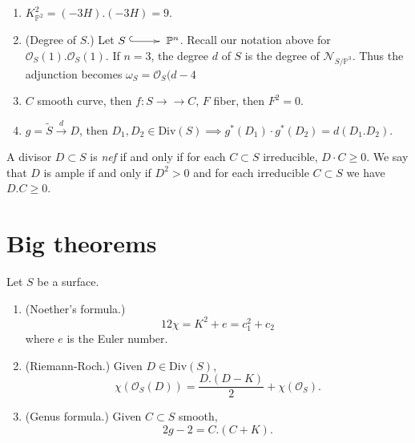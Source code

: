 \begin{example}
\label{example-intersection}
\begin{enumerate}
\item $K_{\mathbb{P}^2}^2=(-3 H).(-3 H)=9$.
\item (Degree of $S$.)
Let $S \xymatrix{\ar@{^{(}->}[r]&}
\mathbb{P}^n$.
Recall our notation above for
$\mathcal{O}_S(1).\mathcal{O}_S(1)$.
If $n=3$,
the degree $d$ of $S$ is the degree of
$\mathcal{N}_{S/\mathbb{P}^3}$.
Thus the adjunction becomes
$\omega_S=\mathcal{O}_S(d-4$

\item $C$ smooth curve, then
$f:S \to\!\!\!\!\!\to C$,
$F$ fiber, then  $F^2=0$.

\item $g=\tilde{S}\overset{d}{\to}D$,
then $D_1,D_2 \in \text{Div}(S)\implies
g^*(D_1)\cdot g^*(D_2)=d(D_1.D_2)$.
\end{enumerate}
\end{example}

\begin{definition}
\label{definition-nef-and-ample}
A divisor $D \subset S$ is {\it nef} if and
only if
for each $C \subset S$ irreducible,
$D\cdot C \geq 0$.
We say that $D$ is ample if and only if
$D^2>0$ and for each irreducible $C \subset
S$
we have $D.C \geq 0$.
\end{definition}

\section{Big theorems}
\label{section-big-theorems}

\begin{theorem}
\label{theorem-}
Let $S$ be a surface.
\begin{enumerate}
\item (Noether's formula.)
$$
12\chi = K^2+e=c_1^2+c_2
$$
where $e$ is the Euler number.

\item (Riemann-Roch.) Given $D \in
\text{Div}(S)$,
$$
\chi(\mathcal{O}_S(D))=\frac{D.(D-K)}{2}+
\chi(\mathcal{O}_S).
$$

\item (Genus formula.) Given $C \subset S$
smooth,
$$
2g-2=C.(C+K).
$$
\end{enumerate}
\end{theorem}

